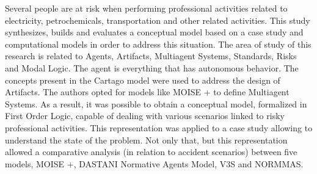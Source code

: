 Several people are at risk when performing professional activities related to electricity, petrochemicals, transportation and other related activities. This study synthesizes, builds and evaluates a conceptual model based on a case study and computational models in order to address this situation. The area of ​​study of this research is related to Agents, Artifacts, Multiagent Systems, Standards, Risks and Modal Logic. The agent is everything that has autonomous behavior. The concepts present in the Cartago model were used to address the design of Artifacts. The authors opted for models like MOISE + to define Multiagent Systems. As a result, it was possible to obtain a conceptual model, formalized in First Order Logic, capable of dealing with various scenarios linked to risky professional activities. This representation was applied to a case study allowing to understand the state of the problem. Not only that, but this representation allowed a comparative analysis (in relation to accident scenarios) between five models, MOISE +, DASTANI Normative Agents Model, V3S and NORMMAS.